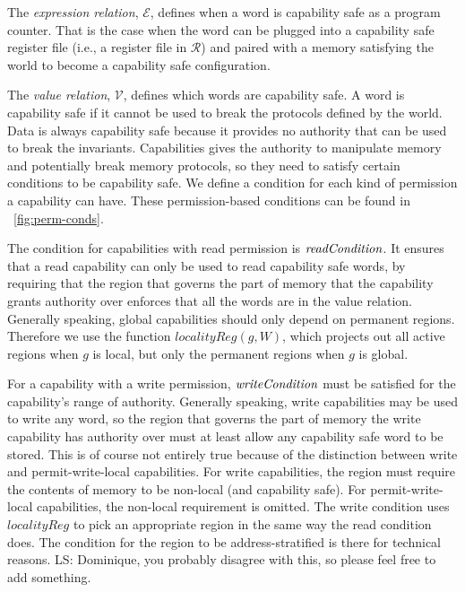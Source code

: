 \documentclass[compsoc,conference,letterpaper,fleqn]{IEEEtran}
\newcommand\lau[1]{{\color{purple} \sf \footnotesize {LS: #1}}\\}
\newcommand{\var}[1]{\mathit{#1}}
\newcommand{\plainfun}[2]{
  \ifthenelse{\equal{#2}{}}
  {\mathit{#1}}
  {\mathit{#1}(#2)}
}
\newcommand{\readCond}[1]{\plainfun{readCondition}{#1}}
\newcommand{\writeCond}[1]{\plainfun{writeCondition}{#1}}
\newcommand{\asmType}{\plaindom{AsmType}}
\newcommand{\plaindom}[1]{\mathrm{#1}}
\newcommand{\intr}[2]{\mathcal{#1}}
\newcommand{\valueintr}[1]{\intr{V}{#1}}
\newcommand{\exprintr}[1]{\intr{E}{#1}}
\newcommand{\regintr}[1]{\intr{R}{#1}}
\newcommand{\stdvr}{\valueintr{\asmType}}
\newcommand{\stder}{\exprintr{\asmType}}
\newcommand{\stdrr}{\regintr{\asmType}}
\begin{document}
The \emph{expression relation}, $\stder$, defines when a word is
capability safe as a program counter. That is the case when the word can be plugged into a
capability safe register file (i.e., a register file in $\stdrr$) and
paired with a memory satisfying the world to become a capability safe
configuration.

The \emph{value relation}, $\stdvr$, defines which words are capability
safe. A word is capability safe if it cannot be used to break the
protocols defined by the world. Data is always capability safe because
it provides no authority that can be used to break the
invariants. Capabilities gives the authority to manipulate memory and
potentially break memory protocols, so they need to satisfy certain
conditions to be capability safe. We define a condition for each kind
of permission a capability can have. These permission-based conditions
can be found in \figurename~\ref{fig:perm-conds}. 

The condition for capabilities with read permission is
$\readCond{}$. It ensures that a read capability can only be used to
read capability safe words, by requiring that the region that governs
the part of memory that the capability grants authority over enforces
that all the words are in the value relation. Generally speaking,
global capabilities should only depend on permanent regions. Therefore
we use the function $\var{localityReg}(g,W)$, which projects out all
active regions when $g$ is local, but only the permanent regions when
$g$ is global.

For a capability with a write permission, $\writeCond{}$ must be
satisfied for the capability's range of authority. Generally speaking,
write capabilities may be used to write any word, so the region that
governs the part of memory the write capability has authority over
must at least allow any capability safe word to be stored.
This is of course not entirely true because of the distinction between
write and permit-write-local capabilities. For write capabilities, the
region must require the contents of memory to be non-local (and
capability safe). For permit-write-local capabilities, the
non-local requirement is omitted.
The write condition uses $\var{localityReg}$ to pick an appropriate
region in the same way the read condition does.
The condition for the region to be address-stratified is there for
technical reasons.\lau{Dominique, you probably disagree with this, so
  please feel free to add something.}
\end{document}
